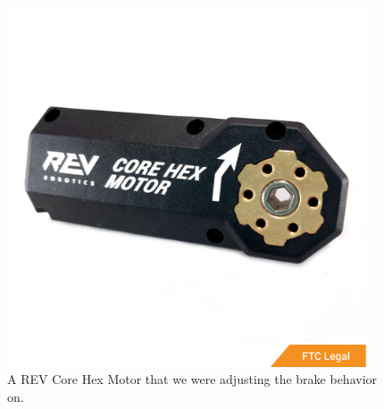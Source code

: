 \begin{figure}[htp]
\centering
\includegraphics[width=0.95\textwidth, angle=0]{Meetings/March/03-31-22/03-31-22 1.jpg}
\caption{A REV Core Hex Motor that we were adjusting the brake behavior on.}
\label{fig:033122_1}
\end{figure}




